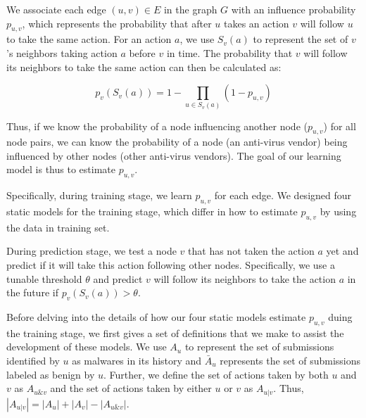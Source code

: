 We associate each edge $(u, v) \in E$ in the graph $G$ 
with an influence probability $p_{u,v}$,
which represents the probability that after $u$ takes an action $v$ will follow $u$ to take the same action. 
For an action $a$, we use $S_v(a)$ to represent the set of $v$'s neighbors taking action $a$ before $v$ in time. 
The probability that $v$ will follow its neighbors to take the same action can then be calculated as:

\begin{equation} \label{eq:setp}
p_v(S_v(a)) = 1 - \prod\limits_{u \in S_v(a)}(1 - p_{u,v})
\end{equation}

Thus, if we know the probability of a node influencing another node ($p_{u,v}$) for all node pairs,
we can know the probability of a node (an anti-virus vendor) being influenced by other nodes (other anti-virus vendors).
The goal of our learning model is thus to estimate $p_{u,v}$.

Specifically, during training stage, we learn $p_{u,v}$ for each edge. 
We designed four static models for the training stage, which differ in how to estimate $p_{u,v}$ by using the data in training set. 

During prediction stage, we test a node $v$ that has not taken the action $a$ yet
and predict if it will take this action following other nodes. 
Specifically, we use a tunable threshold $\theta$
and predict $v$ will follow its neighbors to take the action $a$ in the future
if $p_v(S_v(a))>\theta$.

Before delving into the details of how our four static models estimate $p_{u,v}$ duing the training stage, 
we first gives a set of definitions that we make to assist the development of these models.
We use $A_u$ to represent the set of submissions identified by $u$ as malwares in its history
and $\bar{A}_u$ represents the set of submissions labeled as benign by $u$.
Further, we define the set of actions taken by both $u$ and $v$ as $A_{u\&v}$ 
and the set of actions taken by either $u$ or $v$ as $A_{u|v}$.
Thus, $|A_{u|v}| =   |A_u| + |A_v| - |A_{u\&v}|$.

